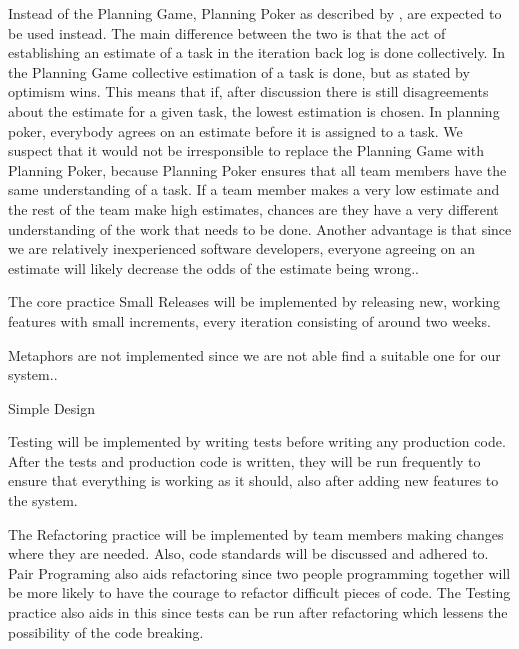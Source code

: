 Instead of the Planning Game, Planning Poker as described by \citet{xp:planningPoker} , are expected to be used instead. The main difference between the two is that the act of establishing an estimate of a task in the iteration back log is done collectively. In the Planning Game collective estimation of a task is done, but as stated by \citet[p. 58]{xp:planning} optimism wins. This means that if, after discussion there is still disagreements about the estimate for a given task, the lowest estimation is chosen. In planning poker, everybody agrees on an estimate before it is assigned to a task. We suspect that it would not be irresponsible to replace the Planning Game with Planning Poker, because Planning Poker ensures that all team members have the same understanding of a task. If a team member makes a very low estimate and the rest of the team make high estimates, chances are they have a very different understanding of the work that needs to be done. Another advantage is that since we are relatively inexperienced software developers, everyone agreeing on an estimate will likely decrease the odds of the estimate being wrong..

The core practice Small Releases will be implemented by releasing new, working features with small increments, every iteration consisting of around two weeks.

Metaphors are not implemented since we are not able find a suitable one for our system..

Simple Design

Testing will be implemented by writing tests before writing any production code. After the tests and production code is written, they will be run frequently to ensure that everything is working as it should, also after adding new features to the system.

The Refactoring practice will be implemented by team members making changes where they are needed. Also, code standards will be discussed and adhered to. Pair Programing also aids refactoring since two people programming together will be more likely to have the courage to refactor difficult pieces of code. The Testing practice also aids in this since tests can be run after refactoring which lessens the possibility of the code breaking.


